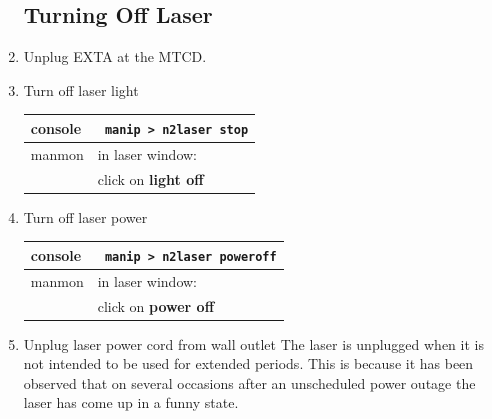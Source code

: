 \documentclass[11pt]{article}
\begin{document}
\begin{enumerate}
\subsection{Turning Off Laser}
\item \CheckBox[name=TOL1]{} Unplug EXTA at the MTCD.
\item \CheckBox[name=TOL2]{} Turn off laser light  
\begin{center}
\begin{tabular}{|l|l|}
\hline
console & \verb+ manip > n2laser stop+ \\
\hline
manmon & in laser window: \\
& click on {\bf light off} \\
\hline
\end{tabular}
\end{center}
\item \CheckBox[name=TOL3]{} Turn off laser power
\begin{center}
\begin{tabular}{|l|l|}
\hline
console & \verb+ manip > n2laser poweroff+ \\
\hline
manmon & in laser window: \\
& click on {\bf power off} \\
\hline
\end{tabular}
\end{center}
\item \CheckBox[name=TOL4]{} Unplug laser power cord from wall outlet
The laser is unplugged when it is not intended to be used for extended periods. This is because it has been observed that on several occasions after an unscheduled power outage the laser has come up in a funny state.


\end{enumerate}
\end{document}

